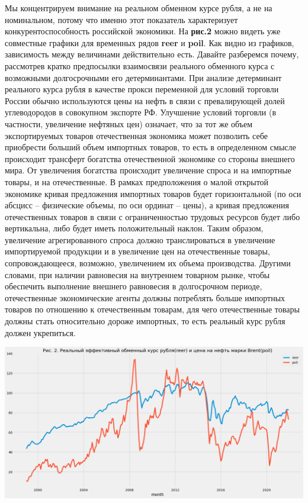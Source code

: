\documentclass{article}
\begin{document}
Мы концентрируем внимание на реальном обменном курсе рубля, а не на номинальном, потому что именно этот показатель характеризует конкурентоспособность российской экономики. На \textbf{рис.2} можно видеть уже совместные графики для временных рядов \textbf{reer} и \textbf{poil}. Как видно из графиков, зависимость между величинами действительно есть. Давайте разберемся почему, рассмотрев кратко предпосылки взаимосвязи реального обменного курса с возможными долгосрочными его детерминантами. При анализе детерминант реального курса рубля в качестве прокси переменной для условий торговли России обычно используются цены на нефть в связи с превалирующей долей углеводородов в совокупном экспорте РФ. Улучшение условий торговли (в частности, увеличение нефтяных цен) означает, что за тот же объем экспортируемых товаров отечественная экономика может позволить себе приобрести больший объем импортных товаров, то есть в определенном смысле происходит трансферт богатства отечественной экономике со стороны внешнего мира. От увеличения богатства происходит увеличение спроса и на импортные товары, и на отечественные. В рамках предположения о малой открытой экономике кривая предложения импортных товаров будет горизонтальной (по оси абсцисс – физические объемы, по оси ординат – цены), а кривая предложения отечественных товаров в связи с ограниченностью трудовых ресурсов будет либо вертикальна, либо будет иметь положительный наклон. Таким образом, увеличение агрегированного спроса должно транслироваться в увеличение импортируемой продукции и в увеличение цен на отечественные товары, сопровождающееся, возможно, увеличением их объема производства. Другими словами, при наличии равновесия на внутреннем товарном рынке, чтобы обеспечить выполнение внешнего равновесия в долгосрочном периоде, отечественные экономические агенты должны потреблять больше импортных товаров по отношению к отечественным товарам, для чего отечественные товары должны стать относительно дороже импортных, то есть реальный курс рубля должен укрепиться.

\begin{center}
\includegraphics[width=150mm]{pics/reer_poil.png}
\end{center}
\end{document}
